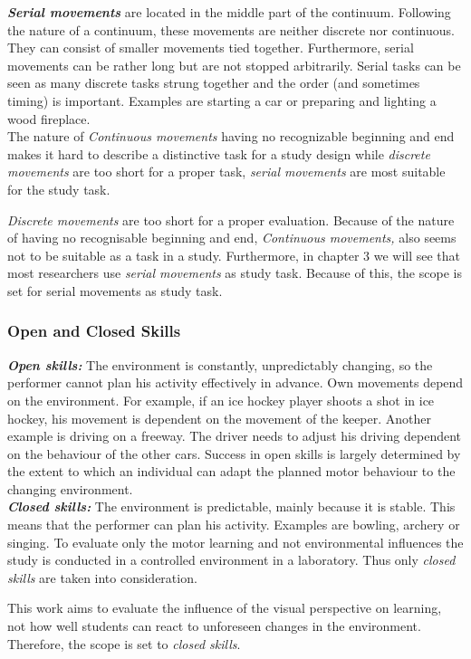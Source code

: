 \textit{\textbf{Serial movements}} are located in the middle part of the continuum. Following the nature of a continuum, these movements are neither discrete nor continuous. They can consist of smaller movements tied together. Furthermore, serial movements can be rather long but are not stopped arbitrarily. Serial tasks can be seen as many discrete tasks strung together and the order (and sometimes timing) is important. Examples are starting a car or preparing and lighting a wood fireplace.\\
The nature of \textit{Continuous movements} having no recognizable beginning and end makes it hard to describe a distinctive task for a study design while \textit{discrete movements} are too short for a proper task, \textit{serial movements} are most suitable for the study task.\\
\begin{tcolorbox}[colback=red!20!white]
\textit{Discrete movements} are too short for a proper evaluation. Because of the nature of having no recognisable beginning and end, \textit{Continuous movements,} also seems not to be suitable as a task in a study. Furthermore, in chapter 3 we will see that most researchers use \textit{serial movements} as study task. Because of this, the scope is set for serial movements as study task.
\end{tcolorbox}

\subsubsection{Open and Closed Skills}
\textit{\textbf{Open skills:}} The environment is constantly, unpredictably changing, so the performer cannot plan his activity effectively in advance. Own movements depend on the environment. For example, if an ice hockey player shoots a shot in ice hockey, his movement is dependent on the movement of the keeper. Another example is driving on a freeway. The driver needs to adjust his driving dependent on the behaviour of the other cars. Success in open skills is largely determined by the extent to which an individual can adapt the planned motor behaviour to the changing environment.\\
\textit{\textbf{Closed skills:}} The environment is predictable, mainly because it is stable. This means that the performer can plan his activity. Examples are bowling, archery or singing. To evaluate only the motor learning and not environmental influences the study is conducted in a controlled environment in a laboratory. Thus only \textit{closed skills} are taken into consideration.\\
\begin{tcolorbox}[colback=red!30!white]
This work aims to evaluate the influence of the visual perspective on learning, not how well students can react to unforeseen changes in the environment. Therefore, the scope is set to \textit{closed skills}.
\end{tcolorbox}

